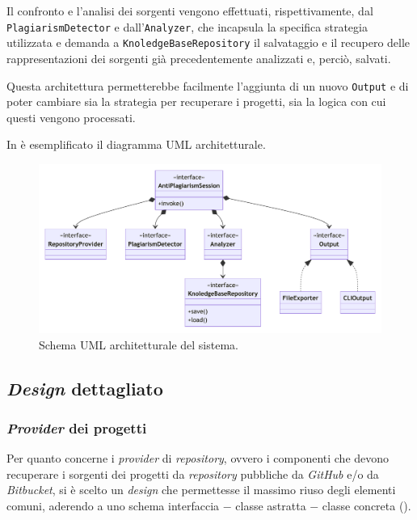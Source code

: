 Il confronto e l'analisi dei sorgenti vengono effettuati, rispettivamente, dal \texttt{PlagiarismDetector} e dall'\texttt{Analyzer}, che incapsula la specifica strategia utilizzata e demanda a \texttt{KnoledgeBaseRepository} il salvataggio e il recupero delle rappresentazioni dei sorgenti già precedentemente analizzati e, perciò, salvati.

Questa architettura permetterebbe facilmente l'aggiunta di un nuovo \texttt{Output} e di poter cambiare sia la strategia per recuperare i progetti, sia la logica con cui questi vengono processati.

In  è esemplificato il diagramma UML architetturale.

\begin{figure}[h!]
    \centering
    \includegraphics[width=\textwidth]{resources/img/02-achitecture.pdf}
    \caption{Schema UML architetturale del sistema.}
    \label{img:02-architecture}
\end{figure}
%
%

\subsection{\textit{Design} dettagliato}

\subsubsection*{\textit{Provider} dei progetti}
Per quanto concerne i \textit{provider} di \textit{repository}, ovvero i componenti che devono recuperare i sorgenti dei progetti da \textit{repository} pubbliche da \textit{GitHub} e/o da \textit{Bitbucket}, si è scelto un \textit{design} che permettesse il massimo riuso degli elementi comuni, aderendo a uno schema interfaccia $-$ classe astratta $-$ classe concreta ().

